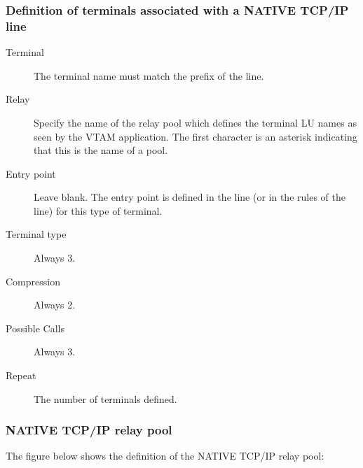 \documentclass[letterpaper,10pt,english]{sphinxmanual}
\begin{document}


\subsubsection{Definition of terminals associated with a NATIVE TCP/IP line}
\label{\detokenize{connectivity_guide:definition-of-terminals-associated-with-a-native-tcp-ip-line}}\begin{description}
\item[{Terminal}] \leavevmode
The terminal name must match the prefix of the line.

\item[{Relay}] \leavevmode
Specify the name of the relay pool which defines the terminal LU
names as seen by the VTAM application. The first character is an
asterisk indicating that this is the name of a pool.

\item[{Entry point}] \leavevmode
Leave blank. The entry point is defined in the line (or in the rules
of the line) for this type of terminal.

\item[{Terminal type}] \leavevmode
Always 3.

\item[{Compression}] \leavevmode
Always 2.

\item[{Possible Calls}] \leavevmode
Always 3.

\item[{Repeat}] \leavevmode
The number of terminals defined.

\end{description}


\subsubsection{NATIVE TCP/IP relay pool}
\label{\detokenize{connectivity_guide:native-tcp-ip-relay-pool}}
The figure below shows the definition of the NATIVE TCP/IP relay pool:

\end{document}
